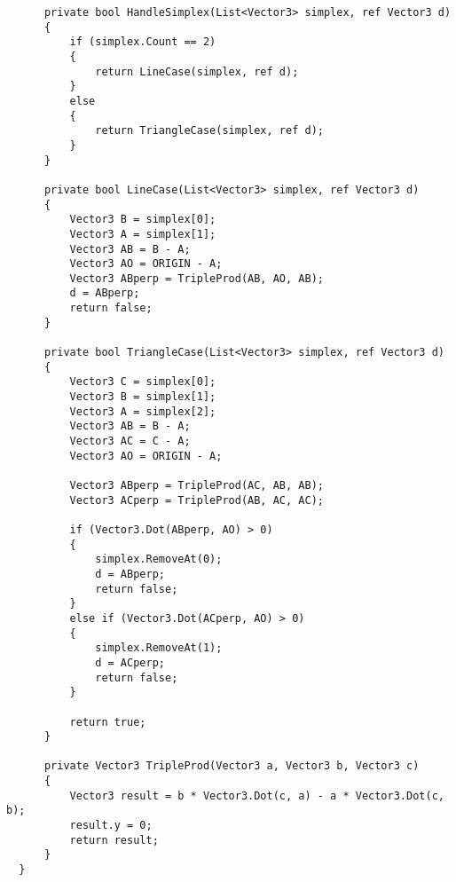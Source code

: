 \begin{lstlisting}
      private bool HandleSimplex(List<Vector3> simplex, ref Vector3 d)
      {
          if (simplex.Count == 2)
          {
              return LineCase(simplex, ref d);
          }
          else
          {
              return TriangleCase(simplex, ref d);
          }
      }
  
      private bool LineCase(List<Vector3> simplex, ref Vector3 d)
      {
          Vector3 B = simplex[0];
          Vector3 A = simplex[1];
          Vector3 AB = B - A;
          Vector3 AO = ORIGIN - A;
          Vector3 ABperp = TripleProd(AB, AO, AB);
          d = ABperp;
          return false;
      }
  
      private bool TriangleCase(List<Vector3> simplex, ref Vector3 d)
      {
          Vector3 C = simplex[0];
          Vector3 B = simplex[1];
          Vector3 A = simplex[2];
          Vector3 AB = B - A;
          Vector3 AC = C - A;
          Vector3 AO = ORIGIN - A;
  
          Vector3 ABperp = TripleProd(AC, AB, AB);
          Vector3 ACperp = TripleProd(AB, AC, AC);
  
          if (Vector3.Dot(ABperp, AO) > 0)
          {
              simplex.RemoveAt(0);
              d = ABperp;
              return false;
          }
          else if (Vector3.Dot(ACperp, AO) > 0)
          {
              simplex.RemoveAt(1);
              d = ACperp;
              return false;
          }
  
          return true;
      }
  
      private Vector3 TripleProd(Vector3 a, Vector3 b, Vector3 c)
      {
          Vector3 result = b * Vector3.Dot(c, a) - a * Vector3.Dot(c, b);
          result.y = 0;
          return result;
      }
  }

\end{lstlisting}


